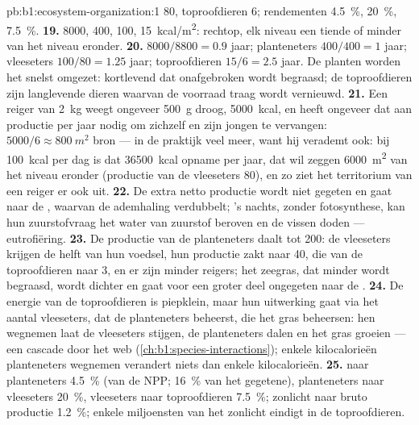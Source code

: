 \begin{solution}{pb:b1:ecosystem-organization:1}
\qty{80}{}, toproofdieren \qty{6}{}; rendementen \qty{4.5}{\%},
\qty{20}{\%}, \qty{7.5}{\%}.
\textbf{19.} \qty{8000}{}, \qty{400}{}, \qty{100}{}, \qty{15}{kcal/m^2}:
rechtop, elk niveau een tiende of minder van het niveau eronder.
\textbf{20.}  $8000/8800 = 0.9$ jaar; planteneters $400/400 =
1$ jaar; vleeseters $100/80 = 1.25$ jaar; toproofdieren $15/6 =
2.5$ jaar. De planten worden het snelst omgezet: kortlevend  dat
onafgebroken wordt begraasd; de toproofdieren zijn langlevende dieren
waarvan de voorraad traag wordt vernieuwd.
\textbf{21.} Een reiger van \qty{2}{kg} weegt ongeveer \qty{500}{g} droog,
\qty{5000}{kcal}, en heeft ongeveer dat aan productie per jaar nodig om
zichzelf en zijn jongen te vervangen: $5000/6 \approx \qty{800}{m^2}$ bron
--- in de praktijk veel meer, want hij verademt ook: bij
\qty{100}{kcal} per dag is dat \qty{36500}{kcal} opname per jaar, dat wil
zeggen \qty{6000}{m^2} van het niveau eronder (productie van de vleeseters
\qty{80}{}), en zo ziet het territorium van een reiger er ook uit.
\textbf{22.} De extra netto productie wordt niet gegeten en gaat naar de
, waarvan de ademhaling verdubbelt; 's nachts, zonder
fotosynthese, kan hun zuurstofvraag het water van zuurstof beroven en de
vissen doden --- eutrofiëring.
\textbf{23.} De productie van de planteneters daalt tot \qty{200}{}: de
vleeseters krijgen de helft van hun voedsel, hun productie zakt naar
\qty{40}{}, die van de toproofdieren naar 3, en er zijn minder reigers; het
zeegras, dat minder wordt begraasd, wordt dichter en gaat voor een groter
deel ongegeten naar de .
\textbf{24.} De energie van de toproofdieren is piepklein, maar hun uitwerking
gaat via het aantal vleeseters, dat de planteneters beheerst, die het gras
beheersen: hen wegnemen laat de vleeseters stijgen, de planteneters dalen en
het gras groeien --- een cascade door het web
(\cref{ch:b1:species-interactions}); enkele kilocalorieën planteneters
wegnemen verandert niets dan enkele kilocalorieën.
\textbf{25.}  naar planteneters \qty{4.5}{\%} (van de NPP;
\qty{16}{\%} van het gegetene), planteneters naar vleeseters \qty{20}{\%},
vleeseters naar toproofdieren \qty{7.5}{\%}; zonlicht naar bruto productie
\qty{1.2}{\%}; enkele miljoensten van het zonlicht eindigt in de
toproofdieren.
\end{solution}

